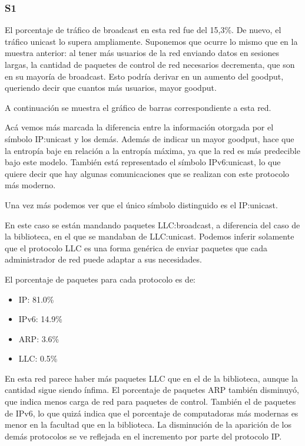 \subsubsection{S1}
El porcentaje de tráfico de broadcast en esta red fue del 15,3\%. De nuevo, el
tráfico unicast lo supera ampliamente. Suponemos que ocurre lo mismo que en 
la muestra anterior: al tener más usuarios de la red enviando datos en 
sesiones largas, la cantidad de paquetes de control de red necesarios 
decrementa, que son en su mayoría de broadcast.
Esto podría derivar en un aumento del goodput, queriendo decir que cuantos 
más usuarios, mayor goodput.

A continuación se muestra el gráfico de barras correspondiente a esta red.


Acá vemos más marcada la diferencia entre la información otorgada por el
símbolo IP:unicast y los demás. Además de indicar un mayor goodput, 
hace que la entropía baje en relación a la entropía máxima, ya que la
red es más predecible bajo este modelo. También está representado el
símbolo IPv6:unicast, lo que quiere decir que hay algunas comunicaciones
que se realizan con este protocolo más moderno.


Una vez más podemos ver que el único símbolo distinguido es el IP:unicast.


En este caso se están mandando paquetes LLC:broadcast, a diferencia del caso
de la biblioteca, en el que se mandaban de LLC:unicast. Podemos inferir solamente
que el protocolo LLC es una forma genérica de enviar paquetes que cada administrador
de red puede adaptar a sus necesidades.


El porcentaje de paquetes para cada protocolo es de:
\begin{itemize}
\item IP: 81.0\%
\item IPv6: 14.9\%
\item ARP: 3.6\%
\item LLC: 0.5\%
\end{itemize}

En esta red parece haber más paquetes LLC que en el de la biblioteca, aunque la 
cantidad sigue siendo ínfima. El porcentaje de paquetes ARP también disminuyó,
que indica menos carga de red para paquetes de control. También el de paquetes
de IPv6, lo que quizá indica que el porcentaje de computadoras más modernas
es menor en la facultad que en la biblioteca. La disminución de la aparición
de los demás protocolos se ve reflejada en el incremento por parte del protocolo
IP.